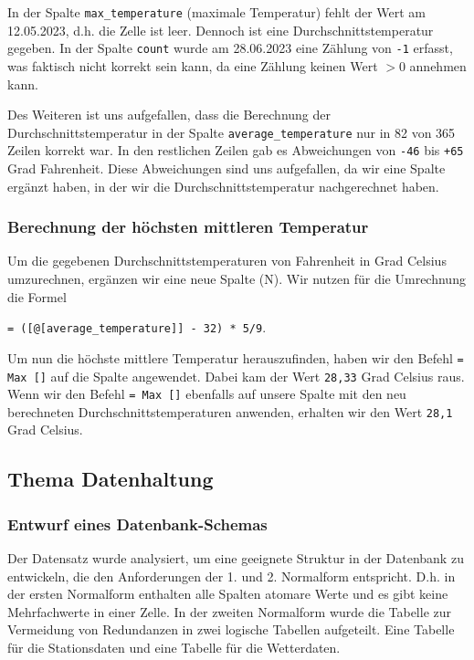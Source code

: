 \documentclass[a4paper,12pt]{article}
\begin{document}
In der Spalte \texttt{max\_temperature} (maximale Temperatur) fehlt der Wert am 12.05.2023, d.h. die Zelle ist leer. Dennoch ist eine Durchschnittstemperatur gegeben.
In der Spalte \texttt{count} wurde am 28.06.2023 eine Zählung von \texttt{-1} erfasst, was faktisch nicht korrekt sein kann, da eine Zählung keinen Wert \texttt{$> 0$} annehmen kann.

Des Weiteren ist uns aufgefallen, dass die Berechnung der Durchschnittstemperatur in der Spalte \texttt{average\_temperature} nur in 82 von 365 Zeilen korrekt war. In den restlichen Zeilen gab es Abweichungen von \texttt{-46} bis \texttt{+65} Grad Fahrenheit. Diese Abweichungen sind uns aufgefallen, da wir eine Spalte ergänzt haben, in der wir die Durchschnittstemperatur nachgerechnet haben.

\subsubsection{Berechnung der höchsten mittleren Temperatur}
Um die gegebenen Durchschnittstemperaturen von Fahrenheit in Grad Celsius umzurechnen, ergänzen wir eine neue Spalte (N). Wir nutzen für die Umrechnung die Formel 

\texttt{= ([@[average\_temperature]] - 32) * 5/9}.

Um nun die höchste mittlere Temperatur herauszufinden, haben wir den Befehl \texttt{= Max []} auf die Spalte angewendet. Dabei kam der Wert \texttt{28,33} Grad Celsius raus. Wenn wir den Befehl \texttt{= Max []} ebenfalls auf unsere Spalte mit den neu berechneten Durchschnittstemperaturen anwenden, erhalten wir den Wert \texttt{28,1} Grad Celsius.

\subsection{Thema Datenhaltung}
\subsubsection{Entwurf eines Datenbank-Schemas}
Der Datensatz wurde analysiert, um eine geeignete Struktur in der Datenbank zu entwickeln, die den Anforderungen der 1. und 2. Normalform entspricht. D.h. in der ersten Normalform enthalten alle Spalten atomare Werte und es gibt keine Mehrfachwerte in einer Zelle. In der zweiten Normalform wurde die Tabelle zur Vermeidung von Redundanzen in zwei logische Tabellen aufgeteilt. Eine Tabelle für die Stationsdaten und eine Tabelle für die Wetterdaten. 
\end{document}
